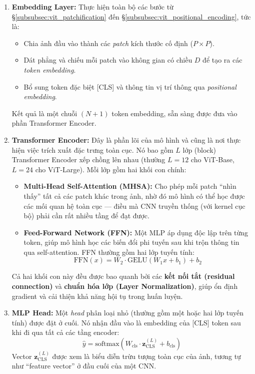 \begin{enumerate}
	\item \textbf{Embedding Layer:}  
	Thực hiện toàn bộ các bước từ \S\ref{subsubsec:vit_patchification} đến \S\ref{subsubsec:vit_positional_encoding}, tức là:
	\begin{itemize}
		\item Chia ảnh đầu vào thành các \textit{patch} kích thước cố định ($P \times P$).
		\item Dát phẳng và chiếu mỗi patch vào không gian có chiều $D$ để tạo ra các \textit{token embedding}.
		\item Bổ sung token đặc biệt [CLS] và thông tin vị trí thông qua \textit{positional embedding}.
	\end{itemize}
	Kết quả là một chuỗi $(N + 1)$ token embedding, sẵn sàng được đưa vào phần Transformer Encoder.
	
	\item \textbf{Transformer Encoder:}  
	Đây là phần lõi của mô hình và cũng là nơi thực hiện việc trích xuất đặc trưng toàn cục. Nó bao gồm $L$ lớp (block) Transformer Encoder xếp chồng lên nhau (thường $L=12$ cho ViT-Base, $L=24$ cho ViT-Large).  
	Mỗi lớp gồm hai khối con chính:
	\begin{itemize}
		\item \textbf{Multi-Head Self-Attention (MHSA):} Cho phép mỗi patch “nhìn thấy” tất cả các patch khác trong ảnh, nhờ đó mô hình có thể học được các mối quan hệ toàn cục — điều mà CNN truyền thống (với kernel cục bộ) phải cần rất nhiều tầng để đạt được.
		\item \textbf{Feed-Forward Network (FFN):} Một MLP áp dụng độc lập trên từng token, giúp mô hình học các biến đổi phi tuyến sau khi trộn thông tin qua self-attention.  
		FFN thường gồm hai lớp tuyến tính:
		\begin{equation}
			\text{FFN}(x) = W_2 \cdot \text{GELU}(W_1 x + b_1) + b_2
		\end{equation}
	\end{itemize}
	Cả hai khối con này đều được bao quanh bởi các \textbf{kết nối tắt (residual connection)} và \textbf{chuẩn hóa lớp (Layer Normalization)}, giúp ổn định gradient và cải thiện khả năng hội tụ trong huấn luyện.
	
	\item \textbf{MLP Head:}  
	Một \textit{head} phân loại nhỏ (thường gồm một hoặc hai lớp tuyến tính) được đặt ở cuối. Nó nhận đầu vào là embedding của [CLS] token sau khi đi qua tất cả các tầng encoder:
	\begin{equation}
		\hat{y} = \text{softmax}(W_{\text{cls}} \cdot \mathbf{z}_{\text{CLS}}^{(L)} + b_{\text{cls}})
	\end{equation}
	Vector $\mathbf{z}_{\text{CLS}}^{(L)}$ được xem là biểu diễn trừu tượng toàn cục của ảnh, tương tự như “feature vector” ở đầu cuối của một CNN.
\end{enumerate}

